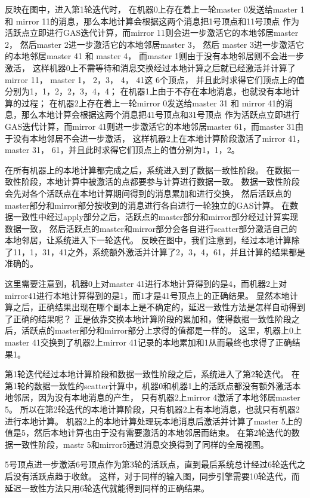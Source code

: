 反映在图中，进入第1轮迭代时，
在机器0上存在着上一轮master 0发送给master 1 和 mirror 11的消息，那么本地计算会根据这两个消息把1号顶点和11号顶点
作为活跃点立即进行GAS迭代计算，而mirror 11则会进一步激活它的本地邻居master 2，
然后master 2进一步激活它的本地邻居master 3， 然后 master 3进一步激活它的本地邻居master 41 和 master 4，
而master 1则由于没有本地邻居则不会进一步激活，
这样机器0上不需等待和消息交换经过本地计算之后就已经激活并计算了mirror 11， master 1， 2，3， 4， 41这 6个顶点，
并且此时求得它们顶点上的值分别为1，1，2，2，3，4，4；
在机器1上由于不存在本地消息，也就没有本地计算的过程；
在机器2上存在着上一轮mirror 0发送给master 31 和 mirror 41的消息，那么本地计算会根据这两个消息把41号顶点和31号顶点
作为活跃点立即进行GAS迭代计算，而mirror 41则进一步激活它的本地邻居master 61，而master 31由于没有本地邻居不会进一步激活，
这样机器2上在本地计算阶段激活了mirror 41， master 31， 61，并且此时求得它们顶点上的值分别为1，1，2。

在所有机器上的本地计算都完成之后，系统进入到了数据一致性阶段。
在数据一致性阶段，本地计算中被激活的点都要参与计算进行数据一致。
数据一致性阶段会先对各个活跃点在本地计算期间得到的消息累加和进行交换，
然后活跃点的master部分和mirror部分按收到的消息进行各自进行一轮独立的GAS计算。
在数据一致性中经过apply部分之后，活跃点的master部分和mirror部分经过计算实现数据一致，
然后活跃点的master和mirror部分会各自进行scatter部分激活自己的本地邻居，让系统进入下一轮迭代。
反映在图中，我们注意到，经过本地计算除了11，1，31，41之外，系统额外激活并计算了2，3，4，61，并且计算的结果都是准确的。

这里需要注意到，机器0上对master 41进行本地计算得到的是4，而机器2上对mirror41进行本地计算得到的是1，而1才是41号顶点上的正确结果。
显然本地计算之后，正确结果出现在哪个副本上是不确定的，延迟一致性方法是怎样自动得到了正确的结果呢？
正是依靠交换本地计算阶段的累加和，使得数据一致性阶段之后，活跃点的master部分和mirror部分上求得的值都是一样的。
这里，机器上0上master 41交换到了机器2上mirror 41记录的本地累加和1从而最终也求得了正确结果1。

第1轮迭代经过本地计算阶段和数据一致性阶段之后，系统进入了第2轮迭代。
在第1轮的数据一致性的scatter计算中，机器0和机器1上的活跃点都没有额外激活本地邻居，因为没有本地消息的产生，
只有机器2上mirror 4激活了本地邻居master 5。
所以在第2轮迭代的本地计算阶段，只有机器2上有本地消息，也就只有机器2进行本地计算。
机器2上的本地计算处理玩本地消息后激活并计算了master 5上的值是5，然后本地计算也由于没有需要激活的本地邻居而结束。
在第2轮迭代的数据一致性阶段，mastr 5和mirror5通过消息交换得到了同样的全局视图。

5号顶点进一步激活6号顶点作为第3轮的活跃点，直到最后系统总计经过6轮迭代之后没有活跃点趋于收敛。
这样，对于同样的输入图，同步引擎需要10轮迭代，而延迟一致性方法只用6轮迭代就能得到同样的正确结果。



